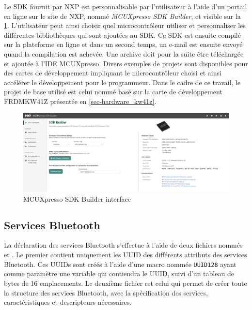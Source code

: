 Le SDK fournit par NXP est personnalisable par l'utilisateur à l'aide d'un portail en ligne sur le site de NXP, nommé \textit{MCUXpresso SDK Builder}, et visible sur la \cref{fig-mcuxpresso_sdk_platform}. L'utilisateur peut ainsi choisir quel microcontrôleur utiliser et personnaliser les différentes bibliothèques qui sont ajoutées au SDK. Ce SDK est ensuite compilé sur la plateforme en ligne et dans un second temps, un e-mail est ensuite envoyé quand la compilation est achevée. Une archive doit pour la suite être téléchargée et ajoutée à l'IDE MCUXpresso. Divers exemples de projets sont disponibles pour des cartes de développement impliquant le microcontrôleur choisi et ainsi accélérer le développement pour le programmeur. Dans le cadre de ce travail, le projet de base utilisé est celui nommé \texttt{} basé sur la carte de développement FRDMKW41Z présentée en \cref{sec-hardware_kw41z}.

\begin{figure}[ht!]
    \centering
    \includegraphics[width=1.0\textwidth]{Figures/Software/kw41z/mcuxpresso_sdk_platform.PNG}
    \caption{MCUXpresso SDK Builder interface}
    \label{fig-mcuxpresso_sdk_platform}
\end{figure}


\FloatBarrier
\subsection{Services Bluetooth}
\label{sec-BLEAllServices}


La déclaration des services Bluetooth s'effectue à l'aide de deux fichiers nommés \texttt{} et \texttt{}. Le premier contient uniquement les UUID des différents attributs des services Bluetooth. Ces UUIDs sont créés à l'aide d'une macro nommée \texttt{UUID128} ayant comme paramètre une variable qui contiendra le UUID, suivi d'un tableau de bytes de 16 emplacements. Le deuxième fichier est celui qui permet de créer toute la structure des services Bluetooth, avec la spécification des services, caractéristiques et descripteurs nécessaires. \\


